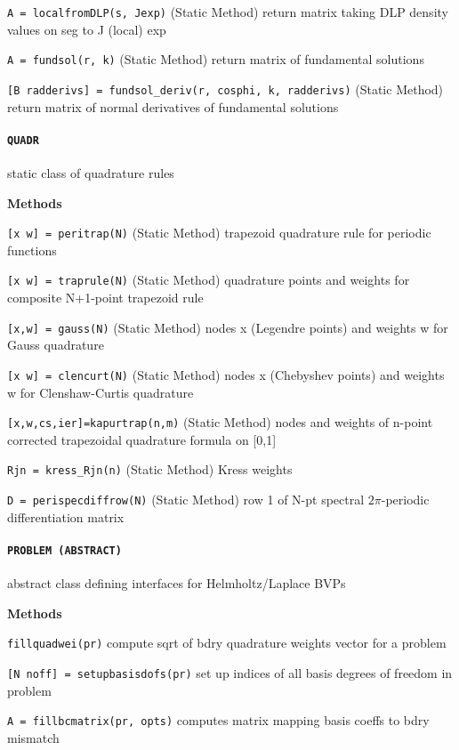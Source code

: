 {\tt A = localfromDLP(s, Jexp)} (Static Method) return matrix taking DLP density
values on seg to J (local) exp

{\tt A = fundsol(r, k)} (Static Method) return matrix of fundamental
solutions

{\tt [B radderivs] = fundsol\_deriv(r, cosphi, k, radderivs)} (Static Method) return
matrix of normal derivatives of fundamental solutions 

\newpage

\paragraph{\tt QUADR} static class of quadrature rules

\textbf{Methods}

{\tt [x w] = peritrap(N)} (Static Method) trapezoid quadrature rule for periodic
functions

{\tt [x w] = traprule(N)} (Static Method) quadrature points and weights for composite
N+1-point trapezoid rule

{\tt [x,w] = gauss(N)} (Static Method) nodes x (Legendre points) and weights w 
for Gauss quadrature

{\tt [x w] = clencurt(N)} (Static Method) nodes x (Chebyshev points) and weights
w for Clenshaw-Curtis quadrature

{\tt [x,w,cs,ier]=kapurtrap(n,m)} (Static Method) nodes and weights of n-point
corrected trapezoidal quadrature formula on [0,1]

{\tt Rjn = kress\_Rjn(n)} (Static Method) Kress weights

{\tt D = perispecdiffrow(N)} (Static Method) row 1 of N-pt spectral
$2\pi$-periodic differentiation matrix

\newpage

\paragraph{\tt PROBLEM (ABSTRACT)} abstract class defining interfaces for
Helmholtz/Laplace BVPs

\textbf{Methods}

{\tt fillquadwei(pr)} compute sqrt of bdry quadrature weights vector
for a problem

{\tt [N noff] = setupbasisdofs(pr)} set up indices of all basis
degrees of freedom in problem

{\tt A = fillbcmatrix(pr, opts)} computes matrix mapping basis coeffs
to bdry mismatch

